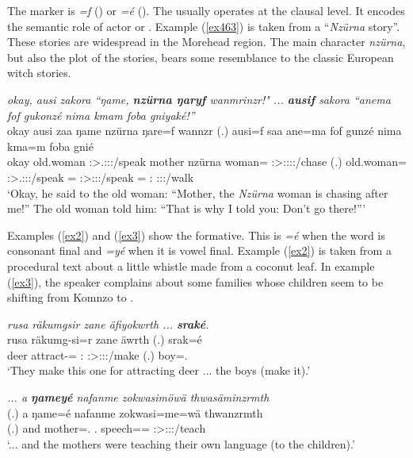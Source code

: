 The   marker is \emph{=f} (\Sg) or \emph{=é} (\Nsg). The  usually operates at the clausal level. It encodes the semantic role of actor or . Example (\ref{ex463}) is taken from a ``\emph{Nzürna} story''. These stories are widespread in the Morehead region. The main character \emph{nzürna}, but also the plot of the stories, bears some resemblance to the classic European witch stories.

\begin{exe}
	\ex \emph{okay, ausi zakora ``ŋame, \textbf{nzürna ŋaryf} wanmrinzr!" ... \textbf{ausif} sakora ``anema fof gukonzé nima kmam foba gniyaké!''}\\
	\gll okay ausi zaa ŋame nzürna ŋare=f wannzr (.) ausi=f saa ane=ma fof gunzé nima kma=m foba gnié\\
	okay {old.woman} \Stsg:\Sbj>\Tsg.\F:\Obj:\Pst:\Pfv/speak mother nzürna woman=\Erg{} \Stsg:\Sbj>\Fsg:\Obj:\Nonpast:\Ipfv:\Venit/chase (.) {old.woman=\Erg} \Stsg:\Sbj>\Tsg.\Masc:\Obj:\Pst:\Pfv/speak \Dem=\Char{} \Emph{} \Fsg:\Sbj>\Ssg:\Obj:\Rpst:\Ipfv/speak \Quot{} \Pot=\Appr{} \Dist:\Abl{} \Ssg:\Sbj:\Imp:\Ipfv/walk\\
	\trans `Okay, he said to the old woman: ``Mother, the \emph{Nzürna} woman is chasing after me!'' The old woman told him: ``That is why I told you: Don't go there!'''
	\label{ex463}
\end{exe} 

Examples (\ref{ex2}) and (\ref{ex3}) show the   formative. This is \emph{=é} when the word is consonant final and \emph{=yé} when it is vowel final. Example (\ref{ex2}) is taken from a procedural text about a little whistle made from a coconut leaf. In example (\ref{ex3}), the speaker complains about some families whose children seem to be shifting from Komnzo to . 

\begin{exe}
	\ex \emph{rusa räkumgsir zane äfiyokwrth ... \textbf{sraké}.}\\
	\gll rusa räkumg-si=r zane äwrth (.) srak=é\\
	deer attract-\Nmlz{}=\Purp{} \Dem:\Prox{} \Stpl:\Sbj>\Stpl:\Obj:\Nonpast:\Ipfv/make (.) boy=\Erg.\Nsg{}\\
	\trans `They make this one for attracting deer ... the boys (make it).'\\
	\label{ex2}
\end{exe}
\begin{exe}
	\ex \emph{... a \textbf{ŋameyé} nafanme zokwasimöwä thwasäminzrmth}\\
	\gll (.) a ŋame=é nafanme zokwasi=me=wä thwanzrmth\\
	(.) and mother=\Erg.\Nsg{} \Tnsg{}.\Poss{} speech=\Ins{}=\Emph{} \Stpl:\Sbj>\Stpl:\Obj:\Pst:\Dur/teach\\
	\trans `... and the mothers were teaching their own language (to the children).'\\ 
	\label{ex3}
\end{exe}

